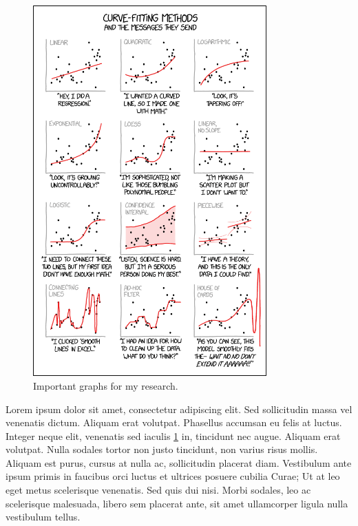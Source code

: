 \begin{figure}[!h]
	\includegraphics[width=0.8\textwidth]{plots/curve_fitting}
	\centering
	\caption{Important graphs for my research.}
	\centering
	\label{fig:curve_fitting}
\end{figure}

Lorem ipsum dolor sit amet, consectetur adipiscing elit. Sed sollicitudin massa vel venenatis dictum. Aliquam erat volutpat. Phasellus accumsan eu felis at luctus. Integer neque elit, venenatis sed iaculis \cref{fig:curve_fitting} in, tincidunt nec augue. Aliquam erat volutpat. Nulla sodales tortor non justo tincidunt, non varius risus mollis. Aliquam est purus, cursus at nulla ac, sollicitudin placerat diam. Vestibulum ante ipsum primis in faucibus orci luctus et ultrices posuere cubilia Curae; Ut at leo eget metus scelerisque venenatis. Sed quis dui nisi. Morbi sodales, leo ac scelerisque malesuada, libero sem placerat ante, sit amet ullamcorper ligula nulla vestibulum tellus.

